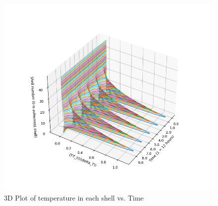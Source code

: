 \documentclass{article}
\begin{document}
\pagebreak
\begin{figure}[h]
    \centering
    \includegraphics[width=0.8\linewidth]{3D Plot.png}
    \caption{3D Plot of temperature in each shell vs. Time}
    \label{3d plot}
\end{figure}
\end{document}

